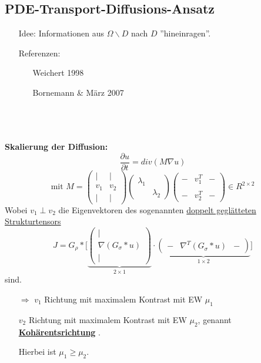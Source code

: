 \documentclass{article}
\theoremstyle{plain}
\theoremstyle{definition}
\numberwithin{equation}{section}
\newcommand{\srmatrix}[1] {
\left( \begin{smallmatrix} #1 \end{smallmatrix} \right)
}
\newcommand{\mim}[1] {
\underline{\textbf{#1\index{#1}}}
}
\newcommand{\mat}[1] {
\begin{pmatrix} #1 \end{pmatrix}
}
\begin{document}
  \subsection{PDE-Transport-Diffusions-Ansatz}
    \begin{minipage}[c]{0.25\linewidth}
      \begin{center}
      \end{center}
    \end{minipage}
    \hfill
    \begin{minipage}[c]{0.65\linewidth}
        \begin{enumerate}
          \item[Idee:] Informationen aus $\Omega \backslash D$ nach $D$ ''hineinragen''.
          \item[Referenzen:] \begin{enumerate}
            \item[\textbullet] Weichert 1998
            \item[\textbullet] Bornemann \& März 2007
          \end{enumerate}
        \end{enumerate}
    \end{minipage}
    \ \\
    \ \\
    \hfill\\
    \textbf{Skalierung der Diffusion:}
    \[\frac{\partial u}{\partial t} = div(M \nabla u)\]
    \[\text{mit } M = \srmatrix{ | & |\\ v_1 & v_2\\ | & |} \mat{\lambda_1 & \ \\ & \lambda_2} \srmatrix{- & v_1^T & -\\ \\- & v_2^T & -} \in R^{2 \times 2}\]
    Wobei $v_1 \perp v_2$ die Eigenvektoren des sogenannten \underline{doppelt geglätteten Strukturtensors} 
    \[J= G_\rho * \biggl[ \underbrace{\srmatrix{| \\ \nabla (G_\sigma * u)\\ |}}_{2 \times 1} \cdot \underbrace{\srmatrix{- & \nabla^T(G_\sigma * u) & -}}_{1 \times 2} \biggr] \]
    sind.\\
    \begin{enumerate}
      \item[$\Rightarrow$] $v_1$ Richtung mit maximalem Kontrast mit EW $\mu_1$
      \item[] $v_2$ Richtung mit maximalem Kontrast mit EW $\mu_2$, genannt \mim{Kohärentsrichtung}.
      \item[] Hierbei ist $\mu_1 \geq \mu_2$.
    \end{enumerate}
    
\end{document}
